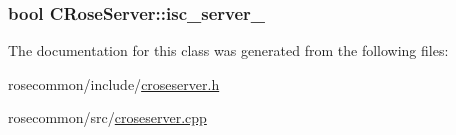 \subsubsection[{\texorpdfstring{isc\+\_\+server\+\_\+}{isc_server_}}]{\setlength{\rightskip}{0pt plus 5cm}bool C\+Rose\+Server\+::isc\+\_\+server\+\_\+\hspace{0.3cm}{\ttfamily [protected]}}\hypertarget{classCRoseServer_a7c2c3a460fdbf47bd2140770f501d9e3}{}\label{classCRoseServer_a7c2c3a460fdbf47bd2140770f501d9e3}


The documentation for this class was generated from the following files\+:\begin{DoxyCompactItemize}
\item 
rosecommon/include/\hyperlink{croseserver_8h}{croseserver.\+h}\item 
rosecommon/src/\hyperlink{croseserver_8cpp}{croseserver.\+cpp}\end{DoxyCompactItemize}
